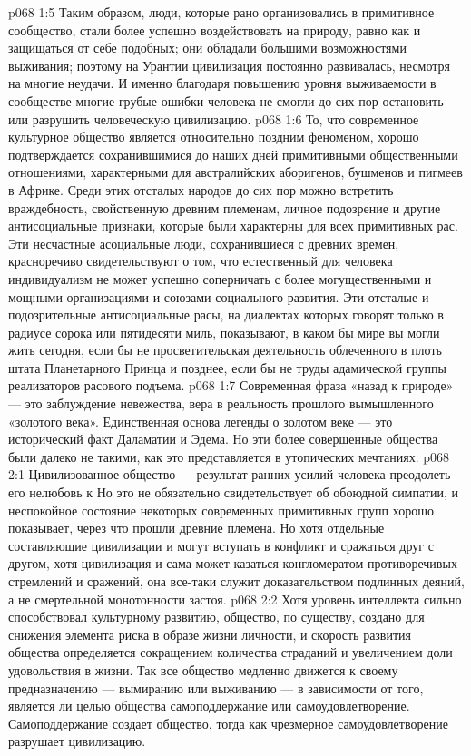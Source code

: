 \vs p068 1:5 Таким образом, люди, которые рано организовались в примитивное сообщество, стали более успешно воздействовать на природу, равно как и защищаться от себе подобных; они обладали большими возможностями выживания; поэтому на Урантии цивилизация постоянно развивалась, несмотря на многие неудачи. И именно благодаря повышению уровня выживаемости в сообществе многие грубые ошибки человека не смогли до сих пор остановить или разрушить человеческую цивилизацию.
\vs p068 1:6 \pc То, что современное культурное общество является относительно поздним феноменом, хорошо подтверждается сохранившимися до наших дней примитивными общественными отношениями, характерными для австралийских аборигенов, бушменов и пигмеев в Африке. Среди этих отсталых народов до сих пор можно встретить враждебность, свойственную древним племенам, личное подозрение и другие антисоциальные признаки, которые были характерны для всех примитивных рас. Эти несчастные асоциальные люди, сохранившиеся с древних времен, красноречиво свидетельствуют о том, что естественный для человека индивидуализм не может успешно соперничать с более могущественными и мощными организациями и союзами социального развития. Эти отсталые и подозрительные антисоциальные расы, на диалектах которых говорят только в радиусе сорока или пятидесяти миль, показывают, в каком бы мире вы могли жить сегодня, если бы не просветительская деятельность облеченного в плоть штата Планетарного Принца и позднее, если бы не труды адамической группы реализаторов расового подъема.
\vs p068 1:7 Современная фраза «назад к природе» --- это заблуждение невежества, вера в реальность прошлого вымышленного «золотого века». Единственная основа легенды о золотом веке --- это исторический факт Даламатии и Эдема. Но эти более совершенные общества были далеко не такими, как это представляется в утопических мечтаниях.
\vs p068 2:1 Цивилизованное общество --- результат ранних усилий человека преодолеть его нелюбовь к  Но это не обязательно свидетельствует об обоюдной симпатии, и неспокойное состояние некоторых современных примитивных групп хорошо показывает, через что прошли древние племена. Но хотя отдельные составляющие цивилизации и могут вступать в конфликт и сражаться друг с другом, хотя цивилизация и сама может казаться конгломератом противоречивых стремлений и сражений, она все\hyp{}таки служит доказательством подлинных деяний, а не смертельной монотонности застоя.
\vs p068 2:2 Хотя уровень интеллекта сильно способствовал культурному развитию, общество, по существу, создано для снижения элемента риска в образе жизни личности, и скорость развития общества определяется сокращением количества страданий и увеличением доли удовольствия в жизни. Так все общество медленно движется к своему предназначению --- вымиранию или выживанию --- в зависимости от того, является ли целью общества самоподдержание или самоудовлетворение. Самоподдержание создает общество, тогда как чрезмерное самоудовлетворение разрушает цивилизацию.
